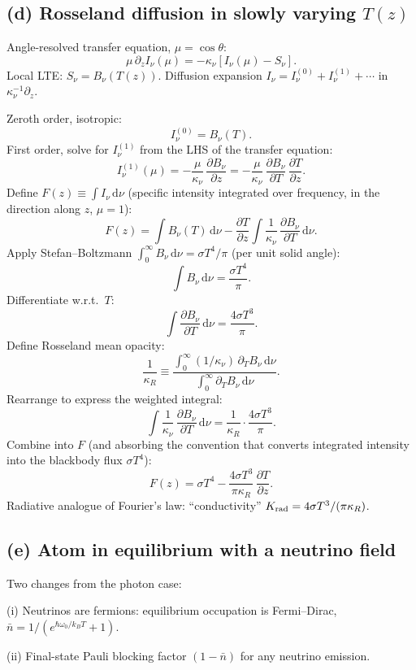 \documentclass[11pt]{article}
\newcommand{\de}{\mathrm{d}}
\newcommand{\pd}[2]{\frac{\partial #1}{\partial #2}}
\begin{document}
\subsection*{(d) Rosseland diffusion in slowly varying $T(z)$}

Angle-resolved transfer equation, $\mu=\cos\theta$:
\[
\mu\,\partial_z I_\nu(\mu)=-\kappa_\nu[I_\nu(\mu)-S_\nu].
\]
Local LTE: $S_\nu=B_\nu(T(z))$. Diffusion expansion $I_\nu=I_\nu^{(0)}+I_\nu^{(1)}+\cdots$ in $\kappa_\nu^{-1}\partial_z$.

Zeroth order, isotropic:
\[
I_\nu^{(0)}=B_\nu(T).
\]
First order, solve for $I_\nu^{(1)}$ from the LHS of the transfer equation:
\[
I_\nu^{(1)}(\mu)=-\frac{\mu}{\kappa_\nu}\,\pd{B_\nu}{z}=-\frac{\mu}{\kappa_\nu}\,\pd{B_\nu}{T}\,\pd{T}{z}.
\]
Define $F(z)\equiv\int I_\nu\,\de\nu$ (specific intensity integrated over frequency, in the direction along $z$, $\mu=1$):
\[
F(z)=\int B_\nu(T)\,\de\nu-\pd{T}{z}\!\int\frac{1}{\kappa_\nu}\,\pd{B_\nu}{T}\,\de\nu.
\]
Apply Stefan--Boltzmann $\int_0^\infty B_\nu\,\de\nu=\sigma T^4/\pi$ (per unit solid angle):
\[
\int B_\nu\,\de\nu=\frac{\sigma T^4}{\pi}.
\]
Differentiate w.r.t.\ $T$:
\[
\int\pd{B_\nu}{T}\,\de\nu=\frac{4\sigma T^3}{\pi}.
\]
Define Rosseland mean opacity:
\[
\frac{1}{\kappa_R}\equiv\frac{\int_0^\infty(1/\kappa_\nu)\,\partial_T B_\nu\,\de\nu}{\int_0^\infty\partial_T B_\nu\,\de\nu}.
\]
Rearrange to express the weighted integral:
\[
\int\frac{1}{\kappa_\nu}\,\pd{B_\nu}{T}\,\de\nu=\frac{1}{\kappa_R}\cdot\frac{4\sigma T^3}{\pi}.
\]
Combine into $F$ (and absorbing the convention that converts integrated intensity into the blackbody flux $\sigma T^4$):
\begin{equation}
\boxed{\;F(z)=\sigma T^4-\frac{4\sigma T^3}{\pi\kappa_R}\,\pd{T}{z}.\;}
\label{eq:Rosseland}
\end{equation}
Radiative analogue of Fourier's law: ``conductivity'' $K_{\rm rad}=4\sigma T^3/(\pi\kappa_R)$.

\subsection*{(e) Atom in equilibrium with a neutrino field}

Two changes from the photon case:

(i) Neutrinos are fermions: equilibrium occupation is Fermi--Dirac, $\bar n=1/(e^{\hbar\omega_0/k_B T}+1)$.

(ii) Final-state Pauli blocking factor $(1-\bar n)$ for any neutrino emission.
\end{document}
